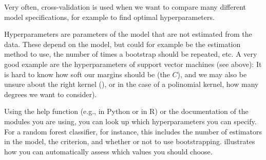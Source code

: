 Very often, cross-validation is used when we want to compare many
different model specifications, for example to find optimal
hyperparameters.

Hyperparameters are parameters of the model that are not estimated
from the data. These depend on the model, but could for example be the
estimation method to use, the number of times a bootstrap should be
repeated, etc. A very good example are the hyperparameters of support
vector machines (see above): It is hard to know how soft our margins
should be (the $C$), and we may also be unsure about the right kernel
(), or in the case of a polinomial kernel, how many
degrees we want to consider).

Using the help function (e.g.,  in
Python or  in R) or the documentation of the
modules you are using, you can look up which hyperparameters you can
specify. For a random forest classifier, for instance, this includes
the number of estimators in the model, the criterion, and whether or
not to use bootstrapping.  illustrates how you can
automatically assess which values you should choose.




